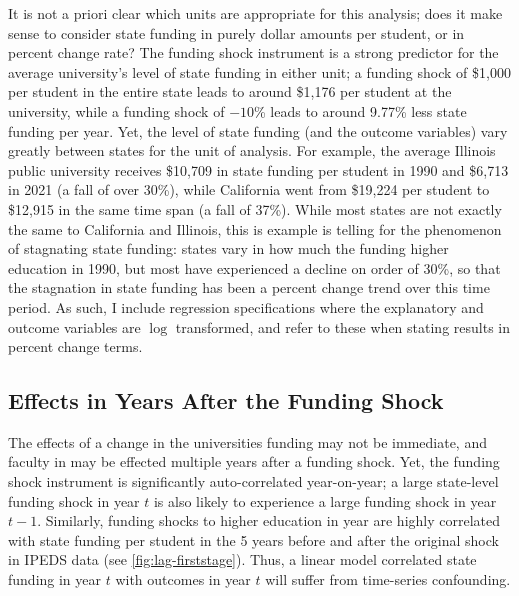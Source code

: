 It is not a priori clear which units are appropriate for this analysis;
does it make sense to consider state funding in purely dollar amounts per student, or in percent change rate?
The funding shock instrument is a strong predictor for the average university's level of state funding in either unit; a funding shock of \$1,000 per student in the entire state leads to around \$1,176 per student at the university, while a funding shock of $-10$\% leads to around 9.77\% less state funding per year.
Yet, the level of state funding (and the outcome variables) vary greatly between states for the unit of analysis.
For example, the average Illinois public university receives \$10,709 in state funding per student in 1990 and  \$6,713 in 2021 (a fall of over 30\%), while California went from \$19,224 per student to \$12,915 in the same time span (a fall of 37\%).
While most states are not exactly the same to California and Illinois, this is example is telling for the phenomenon of stagnating state funding:
states vary in how much the funding higher education in 1990, but most have experienced a decline on order of 30\%, so that the stagnation in state funding has been a percent change trend over this time period.
As such, I include regression specifications where the explanatory and outcome variables are $\log$ transformed, and refer to these when stating results in percent change terms.

\subsection{Effects in Years After the Funding Shock}
\label{sec:empirical-substituion}

The effects of a change in the universities funding may not be immediate, and faculty in may be effected multiple years after a funding shock.
Yet, the funding shock instrument is significantly auto-correlated year-on-year; a large state-level funding shock in year $t$ is also likely to experience a large funding shock in year $t-1$.
Similarly, funding shocks to higher education in year are highly correlated with state funding per student in the 5 years before and after the original shock in IPEDS data (see \autoref{fig:lag-firststage}).
Thus, a linear model correlated state funding in year $t$ with outcomes in year $t$ will suffer from time-series confounding.


